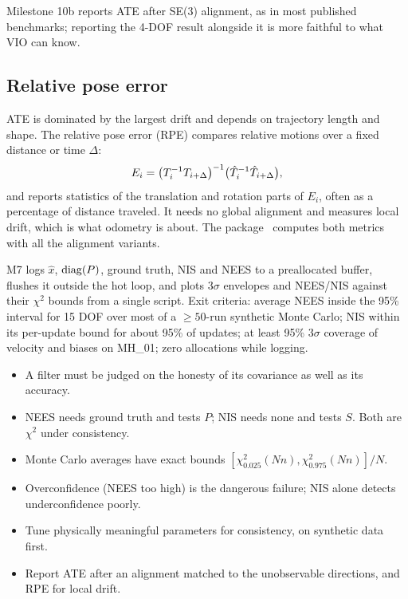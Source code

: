 Milestone 10b reports ATE after SE(3) alignment, as in most published benchmarks; reporting the 4-DOF result
alongside it is more faithful to what VIO can know.

\subsection{Relative pose error}

ATE is dominated by the largest drift and depends on trajectory length and shape. The relative pose error (RPE)
compares relative motions over a fixed distance or time $\Delta$:
\begin{equation}
  E_i = \big(T_{i}^{-1} T_{i+\Delta}\big)^{-1}\big(\hat T_i^{-1}\hat T_{i+\Delta}\big),
\end{equation}
and reports statistics of the translation and rotation parts of $E_i$, often as a percentage of distance traveled. It
needs no global alignment and measures local drift, which is what odometry is about. The 
package~\cite{grupp2017evo} computes both metrics with all the alignment variants.

\begin{projectlink}[Milestone 7]
M7 logs $\hat x$, $\operatorname{diag}(P)$, ground truth, NIS and NEES to a preallocated buffer, flushes it outside the hot loop, and
plots $3\sigma$ envelopes and NEES/NIS against their $\chi^2$ bounds from a single script. Exit criteria: average NEES inside
the 95\% interval for 15 DOF over most of a $\geq50$-run synthetic Monte Carlo; NIS within its per-update bound for about
95\% of updates; at least 95\% $3\sigma$ coverage of velocity and biases on MH\_01; zero allocations while logging.
\end{projectlink}

\begin{takeaways}
\begin{itemize}
  \item A filter must be judged on the honesty of its covariance as well as its accuracy.
  \item NEES needs ground truth and tests $P$; NIS needs none and tests $S$. Both are $\chi^2$ under consistency.
  \item Monte Carlo averages have exact bounds $[\chi^2_{0.025}(Nn), \chi^2_{0.975}(Nn)]/N$.
  \item Overconfidence (NEES too high) is the dangerous failure; NIS alone detects underconfidence poorly.
  \item Tune physically meaningful parameters for consistency, on synthetic data first.
  \item Report ATE after an alignment matched to the unobservable directions, and RPE for local drift.
\end{itemize}
\end{takeaways}


